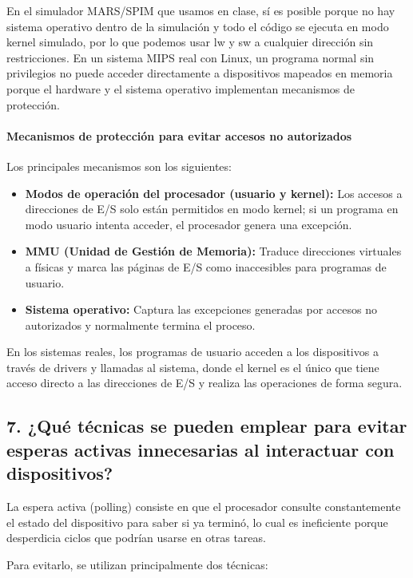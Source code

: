 \documentclass[12pt]{article}
\begin{document}
En el simulador MARS/SPIM que usamos en clase, sí es posible porque no hay sistema operativo dentro de la simulación y todo el código se ejecuta en modo kernel simulado, por lo que podemos usar lw y sw a cualquier dirección sin restricciones. En un sistema MIPS real con Linux, un programa normal sin privilegios no puede acceder directamente a dispositivos mapeados en memoria porque el hardware y el sistema operativo implementan mecanismos de protección.

\paragraph*{Mecanismos de protección para evitar accesos no autorizados}

Los principales mecanismos son los siguientes:

\begin{itemize}
    \item \textbf{Modos de operación del procesador (usuario y kernel):} Los accesos a direcciones de E/S solo están permitidos en modo kernel; si un programa en modo usuario intenta acceder, el procesador genera una excepción.
    \item \textbf{MMU (Unidad de Gestión de Memoria):} Traduce direcciones virtuales a físicas y marca las páginas de E/S como inaccesibles para programas de usuario.
    \item \textbf{Sistema operativo:} Captura las excepciones generadas por accesos no autorizados y normalmente termina el proceso.
\end{itemize}

En los sistemas reales, los programas de usuario acceden a los dispositivos a través de drivers y llamadas al sistema, donde el kernel es el único que tiene acceso directo a las direcciones de E/S y realiza las operaciones de forma segura.

\subsection*{7. ¿Qué técnicas se pueden emplear para evitar esperas activas innecesarias al interactuar con dispositivos?}

La espera activa (polling) consiste en que el procesador consulte constantemente el estado del dispositivo para saber si ya terminó, lo cual es ineficiente porque desperdicia ciclos que podrían usarse en otras tareas.

Para evitarlo, se utilizan principalmente dos técnicas:
\end{document}
